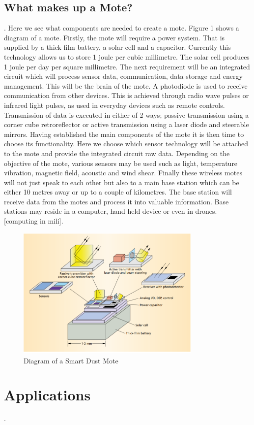 \documentclass[article]{IEEEtran}
\begin{document}
\subsection*{What makes up a Mote?}.\newline
Here we see what components are needed to create a mote. 
Figure 1 shows a diagram of a mote. Firstly, the mote will require a power system. That is supplied by a thick film battery, a solar cell and a capacitor. Currently this technology allows us to store 1 joule per cubic millimetre. The solar cell produces 1 joule per day per square millimetre. 
The next requirement will be an integrated circuit which will process sensor data, communication, data storage and energy management. This will be the brain of the mote. 
A photodiode is used to receive communication from other devices. This is achieved through radio wave pulses or infrared light pulses, as used in everyday devices such as remote controls. 
Transmission of data is executed in either of 2 ways; passive transmission using a corner cube retroreflector or active transmission using a laser diode and steerable mirrors.
Having established the main components of the mote it is then time to choose its functionality. Here we choose which sensor technology will be attached to the mote and provide the integrated circuit raw data. Depending on the objective of the mote, various sensors may be used such as light, temperature vibration, magnetic field, acoustic and wind shear.
Finally these wireless motes will not just speak to each other but also to a main base station which can be either 10 metres away or up to a couple of kilometres.  The base station will receive data from the motes and process it into valuable information. Base stations may reside in a computer, hand held device or even in drones. [computing in mili].

\begin{figure}[h]
\graphicspath{ {images/} }
\includegraphics[width=9cm, height=6.5cm]{figure1}
\caption{Diagram of a Smart Dust Mote}
\end{figure}


\section{Applications}.\newline
\end{document}
